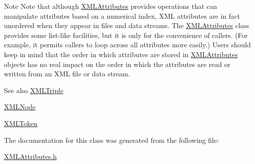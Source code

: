 \begin{DoxyNote}{Note}
Note that although \hyperlink{class_x_m_l_attributes}{X\+M\+L\+Attributes} provides operations that can manipulate attributes based on a numerical index, X\+ML attributes are in fact unordered when they appear in files and data streams. The \hyperlink{class_x_m_l_attributes}{X\+M\+L\+Attributes} class provides some list-\/like facilities, but it is only for the convenience of callers. (For example, it permits callers to loop across all attributes more easily.) Users should keep in mind that the order in which attributes are stored in \hyperlink{class_x_m_l_attributes}{X\+M\+L\+Attributes} objects has no real impact on the order in which the attributes are read or written from an X\+ML file or data stream.
\end{DoxyNote}
\begin{DoxySeeAlso}{See also}
\hyperlink{class_x_m_l_triple}{X\+M\+L\+Triple} 

\hyperlink{class_x_m_l_node}{X\+M\+L\+Node} 

\hyperlink{class_x_m_l_token}{X\+M\+L\+Token} 
\end{DoxySeeAlso}


The documentation for this class was generated from the following file\+:\begin{DoxyCompactItemize}
\item 
\hyperlink{_x_m_l_attributes_8h}{X\+M\+L\+Attributes.\+h}\end{DoxyCompactItemize}

